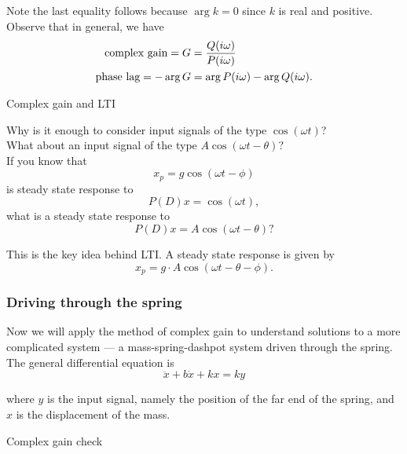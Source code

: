 Note the last equality follows because $\arg k =0$
since $k$ is real and positive. Observe that in general, we have
\begin{align*}
  \displaystyle  \text {complex gain} = G
  \displaystyle &= \displaystyle  \frac{Q(i\omega )}{P(i\omega )}\\
  \displaystyle \text {phase lag} = -\arg G
  \displaystyle &= \displaystyle  \arg P(i\omega ) - \arg Q(i\omega ).
\end{align*}

\begin{exercise}
  Complex gain and LTI
\end{exercise}

Why is it enough to consider input signals of the type $\cos (\omega t)$?\\
What about an input signal of the type $A\cos (\omega t - \theta )$? \\
If you know that
\begin{equation*}
  x_ p = g\cos (\omega t - \phi )
\end{equation*}
is steady state response to
\begin{equation*}
  P(D) x = \cos (\omega t),
\end{equation*}
what is a steady state response to
\begin{equation*}
  P(D) x = A\cos (\omega t-\theta )?
\end{equation*}

This is the key idea behind LTI. A steady state response is given by
\begin{equation*}
  x_ p = g\cdot A \cos (\omega t - \theta - \phi ).
\end{equation*}

\clearpage
\subsubsection{Driving through the spring}

Now we will apply the method of complex gain to understand solutions to a more
complicated system — a mass-spring-dashpot system driven through the spring.
The general differential equation is
\begin{equation*}
  \ddot x + b\dot x + kx = ky
\end{equation*}

where $y$ is the input signal, namely the position of the far end of the spring,
and $x$ is the displacement of the mass.

\begin{exercise}
  Complex gain check
\end{exercise}

